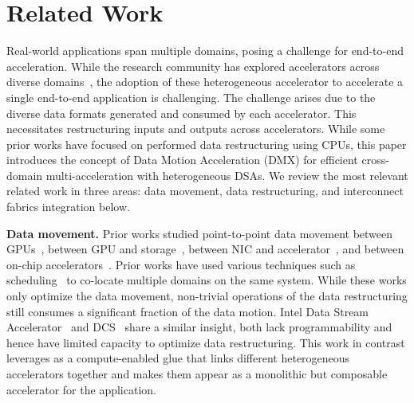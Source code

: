 \section{Related Work}
\label{sec:related}
%
Real-world applications span multiple domains, posing a challenge for end-to-end acceleration.
%
While the research community has explored accelerators across diverse domains~\cite{q100:asplos:2014, meet-the-walkers:isca:2013, doppiodb:fpl:2017,chiosa:pvldb:2022, acc-yolov3:iscas:2020, wfa:fpl:2021, genstore:asplos:2022, segram:isca:2022, meet-the-walker:micro:2013,murray:micro:2016,robox:isca:2018,pointacc:micro:2021,robomorphic:asplos:2021}, the adoption of these heterogeneous accelerator to accelerate a single end-to-end application is challenging.
%
The challenge arises due to the diverse data formats generated and consumed by each accelerator.
%
This necessitates restructuring inputs and outputs across accelerators. 
%
While some prior works have focused on performed data restructuring using CPUs, this paper introduces the concept of Data Motion Acceleration (DMX) for efficient cross-domain multi-acceleration with heterogeneous DSAs.
%
We review the most relevant related work in three areas: data movement, data restructuring, and interconnect fabrics integration below.
%

\noindent \textbf{Data movement.}
%
Prior works studied point-to-point data movement between GPUs~\cite{gpudirect:2019}, between GPU and storage~\cite{morpheus:isca:2016,spin:atc:2017,nds:micro:2021}, between NIC and accelerator~\cite{p2pdma:apsys:2020,lynx:asplos:2020,flexdriver:asplos:2022}, and between on-chip accelerators~\cite{arc:dac:2012}. 
%
Prior works have used various techniques such as scheduling~\cite{wisefuse:sigmetrics:2022, mahapatra:mlarchsys:2022, paragon:asplos:2013, lynx:asplos:2020,flexdriver:asplos:2022} to co-locate multiple domains on the same system. 
%
While these works only optimize the data movement, non-trivial operations of the data restructuring still consumes a significant fraction of the data motion.
%
Intel Data Stream Accelerator~\cite{intel-dsa} and DCS~\cite{dcs:micro:2015, dcs-ctrl:isca:2018} share a similar insight, both lack programmability and hence have limited capacity to optimize data restructuring.
%
This work in contrast leverages \drxs as a compute-enabled glue that links different heterogeneous accelerators together and makes them appear as a monolithic but composable accelerator for the application.
%

